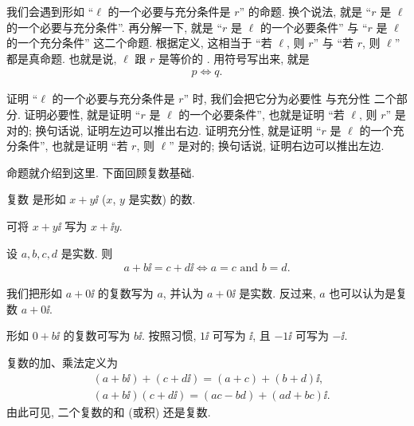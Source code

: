 \begin{remark}
    我们会遇到形如 ``$\ell$ 的一个必要与充分条件是 $r$'' 的命题. 换个说法, 就是 ``$r$ 是 $\ell$ 的一个必要与充分条件''. 再分解一下, 就是 ``$r$ 是 $\ell$ 的一个必要条件'' 与 ``$r$ 是 $\ell$ 的一个充分条件'' 这二个命题. 根据定义, 这相当于 ``若 $\ell$, 则 $r$'' 与 ``若 $r$, 则 $\ell$'' 都是真命题. 也就是说, $\ell$ 跟 $r$ 是等价的 . 用符号写出来, 就是
    \begin{align*}
        p \Leftrightarrow q.
    \end{align*}

    证明 ``$\ell$ 的一个必要与充分条件是 $r$'' 时, 我们会把它分为必要性  与充分性  二个部分. 证明必要性, 就是证明 ``$r$ 是 $\ell$ 的一个必要条件'', 也就是证明 ``若 $\ell$, 则 $r$'' 是对的; 换句话说, 证明左边可以推出右边. 证明充分性, 就是证明 ``$r$ 是 $\ell$ 的一个充分条件'', 也就是证明 ``若 $r$, 则 $\ell$'' 是对的; 换句话说, 证明右边可以推出左边.
\end{remark}

命题就介绍到这里. 下面回顾复数基础.

\begin{definition}
    复数  是形如 $x + y \ii$ ($x$, $y$ 是实数) 的数.
\end{definition}

\begin{remark}
    可将 $x + y \ii$ 写为 $x + \ii y$.
\end{remark}

\begin{definition}
    设 $a,b,c,d$ 是实数. 则
    \begin{align*}
        a + b \ii = c + d \ii \iff a = c \text{ and } b = d.
    \end{align*}
\end{definition}

\begin{remark}
    我们把形如 $a+0 \ii$ 的复数写为 $a$, 并认为 $a+0 \ii$ 是实数. 反过来, $a$ 也可以认为是复数 $a + 0 \ii$.

    形如 $0 + b \ii$ 的复数可写为 $b \ii$. 按照习惯, $1\ii$ 可写为 $\ii$, 且 $-1\ii$ 可写为 $-\ii$.
\end{remark}

\begin{definition}
    复数的加、乘法定义为
    \begin{align*}
         & (a + b \ii) + (c + d \ii) = (a + c) + (b + d) \ii,   \\
         & (a + b \ii) (c + d \ii) = (ac - bd) + (ad + bc) \ii.
    \end{align*}
    由此可见, 二个复数的和 (或积) 还是复数.
\end{definition}

